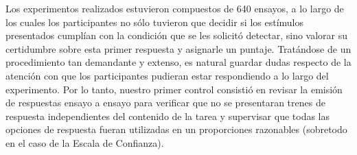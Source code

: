 Los experimentos realizados estuvieron compuestos de 640 ensayos, a lo largo de los cuales los participantes no sólo tuvieron que decidir si los estímulos presentados cumplían con la condición que se les solicitó detectar, sino valorar su certidumbre sobre esta primer respuesta y asignarle un puntaje. Tratándose de un procedimiento tan demandante y extenso, es natural guardar dudas respecto de la atención con que los participantes pudieran estar respondiendo a lo largo del experimento. Por lo tanto, nuestro primer control consistió en revisar la emisión de respuestas ensayo a ensayo para verificar que no se presentaran trenes de respuesta independientes del contenido de la tarea y supervisar que todas las opciones de respuesta fueran utilizadas en un proporciones razonables (sobretodo en el caso de la Escala de Confianza).\\

